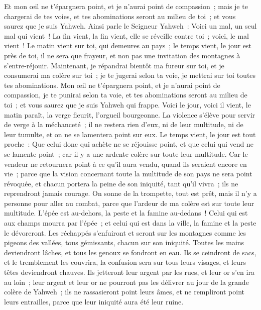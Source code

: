 \begin{multicols}{2}
Et mon œil ne t'épargnera point, et je n'aurai point de compassion~; mais je te chargerai de tes voies, et tes abominations seront au milieu de toi~; et vous saurez que je suis Yahweh.
Ainsi parle le Seigneur Yahweh~: Voici un mal, un seul mal qui vient~!
La fin vient, la fin vient, elle se réveille contre toi~; voici, le mal vient~!
Le matin vient sur toi, qui demeures au pays~; le temps vient, le jour est près de toi, il ne sera que frayeur, et non pas une invitation des montagnes à s'entre-réjouir.
Maintenant, je répandrai bientôt ma fureur sur toi, et je consumerai ma colère sur toi~; je te jugerai selon ta voie, je mettrai sur toi toutes tes abominations.
Mon œil ne t'épargnera point, et je n'aurai point de compassion, je te punirai selon ta voie, et tes abominations seront au milieu de toi~; et vous saurez que je suis Yahweh qui frappe.
Voici le jour, voici il vient, le matin paraît, la verge fleurit, l'orgueil bourgeonne.
La violence s'élève pour servir de verge à la méchanceté~; il ne restera rien d'eux, ni de leur multitude, ni de leur tumulte, et on ne se lamentera point sur eux.
Le temps vient, le jour est tout proche~: Que celui donc qui achète ne se réjouisse point, et que celui qui vend ne se lamente point~; car il y a une ardente colère sur toute leur multitude.
Car le vendeur ne retournera point à ce qu'il aura vendu, quand ils seraient encore en vie~; parce que la vision concernant toute la multitude de son pays ne sera point révoquée, et chacun portera la peine de son iniquité, tant qu'il vivra~; ils ne reprendront jamais courage.
On sonne de la trompette, tout est prêt, mais il n'y a personne pour aller au combat, parce que l'ardeur de ma colère est sur toute leur multitude.
L'épée est au-dehors, la peste et la famine au-dedans~! Celui qui est aux champs mourra par l'épée~; et celui qui est dans la ville, la famine et la peste le dévoreront.
Les réchappés s'enfuiront et seront sur les montagnes comme les pigeons des vallées, tous gémissants, chacun sur son iniquité.
Toutes les mains deviendront lâches, et tous les genoux se fondront en eau.
Ils se ceindront de sacs, et le tremblement les couvrira, la confusion sera sur tous leurs visages, et leurs têtes deviendront chauves.
Ils jetteront leur argent par les rues, et leur or s'en ira au loin~; leur argent et leur or ne pourront pas les délivrer au jour de la grande colère de Yahweh~; ils ne rassasieront point leurs âmes, et ne rempliront point leurs entrailles, parce que leur iniquité aura été leur ruine.

\end{multicols}
